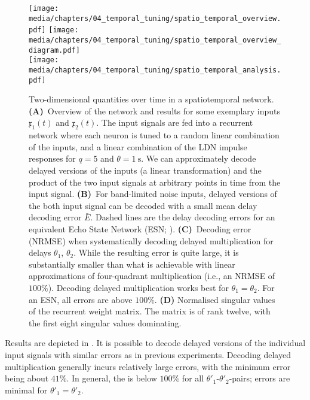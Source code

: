\begin{figure}
	\centering
	\texttt{[image: media/chapters/04\_temporal\_tuning/spatio\_temporal\_overview.pdf]}%
	\kern-158mm\texttt{[image: media/chapters/04\_temporal\_tuning/spatio\_temporal\_overview\_diagram.pdf]}\\[0.5cm]
	\texttt{[image: media/chapters/04\_temporal\_tuning/spatio\_temporal\_analysis.pdf]}%
	{\label{fig:spatio_temporal_a}}%
	{\label{fig:spatio_temporal_b}}%
	{\label{fig:spatio_temporal_c}}%
	{\label{fig:spatio_temporal_d}}%
	\caption[Two-dimensional quantities over time in a spatiotemporal network]{
		Two-dimensional quantities over time in a spatiotemporal network.
		\textbf{(A)}~Overview of the network and results for some exemplary inputs $\mathfrak{x}_1(t)$ and $\mathfrak{x}_2(t)$.
		The input signals are fed into a recurrent network where each neuron is tuned to a random linear combination of the inputs, and a linear combination of the LDN impulse responses for $q = 5$ and $\theta = \SI{1}{\second}$.
		We can approximately decode delayed versions of the inputs (a linear transformation) and the product of the two input signals at arbitrary points in time from the input signal.
		\textbf{(B)}~For band-limited noise inputs, delayed versions of the both input signal can be decoded with a small mean delay decoding error $\bar E$. Dashed lines are the delay decoding errors for an equivalent Echo State Network (ESN; \cite{jaeger2004harnessing}).
		\textbf{(C)}~Decoding error (NRMSE) when systematically decoding delayed multiplication for delays $\theta_1$, $\theta_2$.
		While the resulting error is quite large, it is substantially smaller than what is achievable with linear approximations of four-quadrant multiplication (i.e., an NRMSE of $100\%$). Decoding delayed multiplication works best for $\theta_1 = \theta_2$.
		For an ESN, all errors are above $100\%$.
		\textbf{(D)} Normalised singular values of the recurrent weight matrix.
		The matrix is of rank twelve, with the first eight singular values dominating.
	}
	\label{fig:spatio_temporal}
\end{figure}

Results are depicted in .
It is possible to decode delayed versions of the individual input signals with similar errors as in previous experiments.
Decoding delayed multiplication generally incurs relatively large errors, with the minimum error being about $41\%$.
In general, the \NRMSE is below $100\%$ for all $\theta'_1$-$\theta'_2$-pairs; errors are minimal for $\theta'_1 = \theta'_2$.

